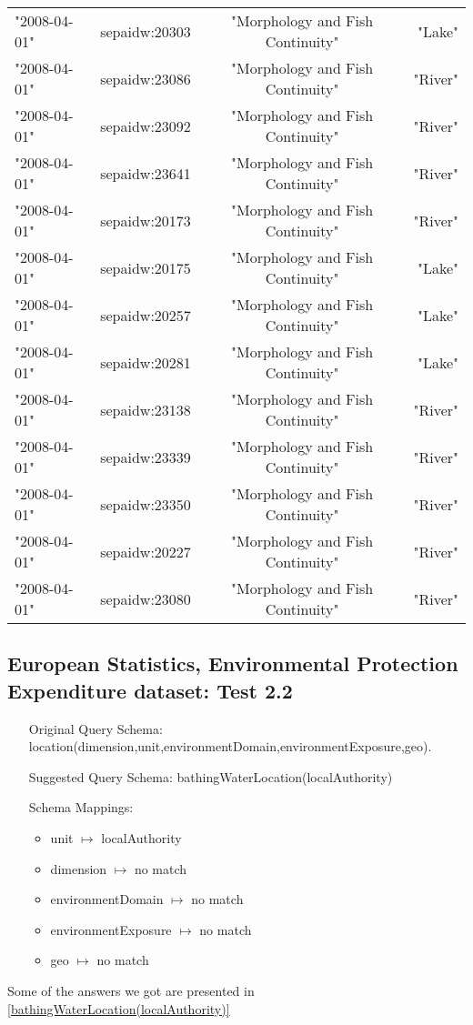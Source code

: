\documentclass[a4paper,10pt]{article}
\begin{document}
\begin{table}[!tb]
\begin{center}
\begin{tabular}{ l l c  r }
 "2008-04-01"   & sepaidw:20303 & "Morphology and Fish Continuity" & "Lake"  \\
 "2008-04-01"   & sepaidw:23086 & "Morphology and Fish Continuity" & "River" \\
 "2008-04-01"   & sepaidw:23092 & "Morphology and Fish Continuity" & "River" \\
 "2008-04-01"   & sepaidw:23641 & "Morphology and Fish Continuity" & "River" \\
 "2008-04-01"   & sepaidw:20173 & "Morphology and Fish Continuity" & "River" \\
 "2008-04-01"   & sepaidw:20175 & "Morphology and Fish Continuity" & "Lake"  \\
 "2008-04-01"   & sepaidw:20257 & "Morphology and Fish Continuity" & "Lake"  \\
 "2008-04-01"   & sepaidw:20281 & "Morphology and Fish Continuity" & "Lake"  \\
 "2008-04-01"   & sepaidw:23138 & "Morphology and Fish Continuity" & "River" \\
 "2008-04-01"   & sepaidw:23339 & "Morphology and Fish Continuity" & "River" \\
 "2008-04-01"   & sepaidw:23350 & "Morphology and Fish Continuity" & "River" \\
 "2008-04-01"   & sepaidw:20227 & "Morphology and Fish Continuity" & "River" \\
 "2008-04-01"   & sepaidw:23080 & "Morphology and Fish Continuity" & "River" 

\end{tabular}
\label{waterBodyPressures(identifiedDate,waterBodyId,assessmentCategory,source)}
\end{center}
\end{table}

\subsection{European Statistics, Environmental Protection Expenditure dataset: Test 2.2}
\label{Test 2.2}


\begin{itemize}
\item[Original Query Schema:]location(dimension,unit,environmentDomain,environmentExposure,geo).
\item[Suggested Query Schema: ]
bathingWaterLocation(localAuthority)
\item[Schema Mappings:] 
		\begin{itemize}
\item unit $\mapsto$ localAuthority
\item dimension $\mapsto$ no match
\item environmentDomain $\mapsto$ no match
\item environmentExposure $\mapsto$ no match
\item geo $\mapsto$ no match

		\end{itemize}
\end{itemize}
Some of the answers we got are presented in  \ref{bathingWaterLocation(localAuthority)}
\end{document}
